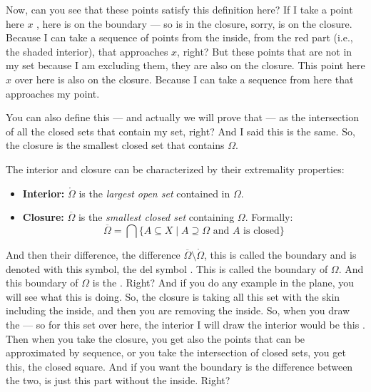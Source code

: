 \begin{spoken-clean}[00:03:40 - 00:05:33]
Now, can you see that these points satisfy this definition here? If I take a point here $x$ , here is on the boundary --- so is in the closure, sorry, is on the closure. Because I can take a sequence of points from the inside, from the red part (i.e., the shaded interior), that approaches $x$, right? But these points that are not in my set because I am excluding them, they are also on the closure. This point here $x$ over here is also on the closure. Because I can take a sequence from here that approaches my point. 

You can also define this --- and actually we will prove that --- as the intersection of all the closed sets that contain my set, right? And I said this is the same. So, the closure is the smallest closed set that contains $\Omega$.
\end{spoken-clean}

\begin{math-stroke}
The interior and closure can be characterized by their extremality properties:
\begin{itemize}
    \item \textbf{Interior:} $\mathring{\Omega}$ is the \emph{largest open set} contained in $\Omega$.
    \item \textbf{Closure:} $\overline{\Omega}$ is the \emph{smallest closed set} containing $\Omega$. Formally:
    \[ \overline{\Omega} = \bigcap \{ A \subseteq X \mid A \supseteq \Omega \text{ and } A \text{ is closed} \} \]
\end{itemize}
\end{math-stroke}

\begin{spoken-clean}[00:05:33 - 00:07:23]
And then their difference, the difference $\overline{\Omega} \setminus \mathring{\Omega}$, this is called the boundary and is denoted with this symbol, the del symbol . This is called the boundary of $\Omega$. And this boundary of $\Omega$ is the . Right? And if you do any example in the plane, you will see what this is doing. So, the closure is taking all this set with the skin including the inside, and then you are removing the inside. So, when you draw the --- so for this set over here, the interior I will draw the interior would be this . Then when you take the closure, you get also the points that can be approximated by sequence, or you take the intersection of closed sets, you get this, the closed square. And if you want the boundary is the difference between the two, is just this part  without the inside. Right?
\end{spoken-clean}


